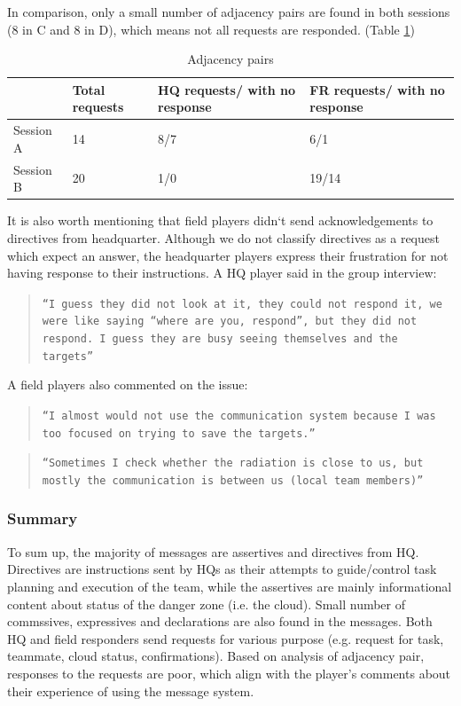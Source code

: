 In comparison, only a small number of adjacency pairs are found in both sessions (8 in C and 8 in D), which means not all requests are responded. (Table \ref{tab:adjpairs})



\begin{table}[h]
\footnotesize
\begin{tabular}{l|p{3cm}p{3cm}p{3cm}}
          & Total requests & HQ requests/ with no response & FR requests/ with no response \\ \hline
Session A & 14                                 & 8/7                                               & 6/1                                                \\
Session B & 20                                 & 1/0                                               & 19/14                                             
\end{tabular}
\caption{Adjacency pairs}
\label{tab:adjpairs}
\end{table}

It is also worth mentioning that field players didn`t send acknowledgements to directives from headquarter. Although we do not classify directives as a request which expect an answer, the headquarter players express their frustration for not having response to their instructions. A HQ player said in the group interview:\\
\begin{quote}
\texttt{``I guess they did not look at it, they could not respond it, we were like saying ``where are you, respond'', but they did not respond. I guess they are busy seeing themselves and the targets''}
\end{quote}

A field players also commented on the issue:\\

\begin{quote}
\texttt{``I almost would not use the communication system because I was too focused on trying to save the targets.''}
\end{quote}

\begin{quote}
\texttt{``Sometimes I check whether the radiation is close to us, but mostly the communication is between us (local team members)''}
\end{quote}

\subsubsection{Summary}
To sum up, the majority of messages are assertives and directives from HQ. Directives are instructions sent by HQs as their attempts to guide/control task planning and execution of the team, while the assertives are mainly informational content about status of the danger zone (i.e. the cloud). Small number of commssives, expressives and declarations are also found in the messages. Both HQ and field responders send requests for various purpose (e.g. request for task, teammate, cloud status, confirmations). Based on analysis of adjacency pair, responses to the requests are poor, which align with the player's comments about their experience of using the message system.

